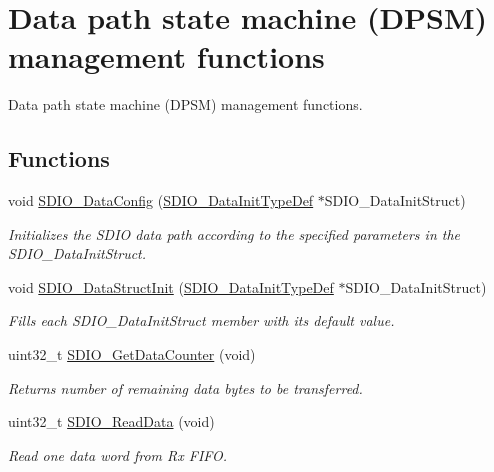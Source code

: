 \hypertarget{group___s_d_i_o___group3}{\section{Data path state machine (D\-P\-S\-M) management functions}
\label{group___s_d_i_o___group3}
}


Data path state machine (D\-P\-S\-M) management functions.  


\subsection*{Functions}
\begin{DoxyCompactItemize}
\item 
void \hyperlink{group___s_d_i_o___group3_gad65d896ae919683585bda44a1e2afae4}{S\-D\-I\-O\-\_\-\-Data\-Config} (\hyperlink{struct_s_d_i_o___data_init_type_def}{S\-D\-I\-O\-\_\-\-Data\-Init\-Type\-Def} $\ast$S\-D\-I\-O\-\_\-\-Data\-Init\-Struct)
\begin{DoxyCompactList}\small\item\em Initializes the S\-D\-I\-O data path according to the specified parameters in the S\-D\-I\-O\-\_\-\-Data\-Init\-Struct. \end{DoxyCompactList}\item 
void \hyperlink{group___s_d_i_o___group3_gaa83209c09e921521aca2587fb5b22ea2}{S\-D\-I\-O\-\_\-\-Data\-Struct\-Init} (\hyperlink{struct_s_d_i_o___data_init_type_def}{S\-D\-I\-O\-\_\-\-Data\-Init\-Type\-Def} $\ast$S\-D\-I\-O\-\_\-\-Data\-Init\-Struct)
\begin{DoxyCompactList}\small\item\em Fills each S\-D\-I\-O\-\_\-\-Data\-Init\-Struct member with its default value. \end{DoxyCompactList}\item 
uint32\-\_\-t \hyperlink{group___s_d_i_o___group3_ga7a28aaa2c25a9a5a8db1f49b0e8c9d0a}{S\-D\-I\-O\-\_\-\-Get\-Data\-Counter} (void)
\begin{DoxyCompactList}\small\item\em Returns number of remaining data bytes to be transferred. \end{DoxyCompactList}\item 
uint32\-\_\-t \hyperlink{group___s_d_i_o___group3_ga4e8ac755ef3c31ecd4ed2708df19187e}{S\-D\-I\-O\-\_\-\-Read\-Data} (void)
\begin{DoxyCompactList}\small\item\em Read one data word from Rx F\-I\-F\-O. \end{DoxyCompactList}\item 

\end{DoxyCompactItemize}
